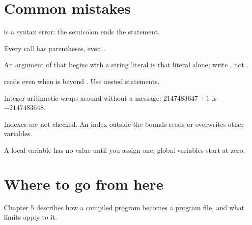 

\section{Common mistakes}
 is a syntax
error: the semicolon ends the  statement.

Every call has parentheses, even
.

An argument of  that
begins with a string literal is that literal alone; write
, not .

 reads
 even when  is beyond .  Use nested 
statements.

Integer arithmetic wraps around without a message:
$2147483647 + 1$ is $-2147483648$.

Indexes are not checked.  An index outside the bounds
reads or overwrites other variables.

A local variable has no value until you assign
one; global variables start at zero.

\section{Where to go from here}
Chapter 5 describes how a compiled program becomes a program file, and
what limits apply to it.
